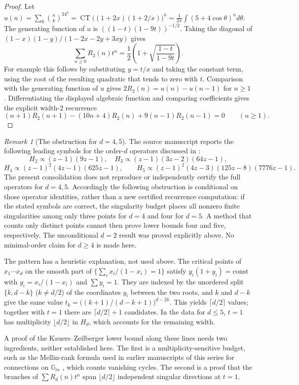 \documentclass[11pt,a4paper]{article}
\theoremstyle{definition}
\theoremstyle{remark}
\newtheorem{remark}[theorem]{Remark}
\numberwithin{equation}{section}
\DeclareMathOperator{\CT}{CT}
\begin{document}
\begin{proof}
Let $u(n)=\sum_k\binom nk^24^k=\CT\bigl((1+2x)(1+2/x)\bigr)^n
=\frac1{2\pi}\int(5+4\cos\theta)^nd\theta$. The generating function of $u$ is $((1-t)(1-9t))^{-1/2}$.
Taking the diagonal of $(1-x)(1-y)/(1-2x-2y+3xy)$ gives
\[
 \sum_{n\ge0}R_2(n)t^n
 =\frac12\left(1+\sqrt{\frac{1-t}{1-9t}}\right).
\]
For example this follows by substituting $y=t/x$ and taking the
constant term, using the root of the resulting quadratic that tends to zero
with $t$. Comparison with the generating function of $u$ gives
$2R_2(n)=u(n)-u(n-1)$ for $n\ge1$. Differentiating the displayed algebraic
function and comparing coefficients gives the explicit width-$2$ recurrence
\[
 (n+1)R_2(n+1)-(10n+4)R_2(n)+9(n-1)R_2(n-1)=0
 \qquad(n\ge1).
\]
\end{proof}

\begin{remark}[The obstruction for $d=4,5$]\label{B:F:rem:rook-obstruction}
The source manuscript reports the following leading symbols for the
order-$d$ operators discussed in \cite[Proposition~2.12]{R022}:
\[
 H_2\propto(z-1)(9z-1),\quad
 H_3\propto(z-1)(3z-2)(64z-1),
\]
\[
 H_4\propto(z-1)^2(4z-1)(625z-1),\qquad
 H_5\propto(z-1)^2(4z-3)(125z-8)(7776z-1).
\]
The present consolidation does not reproduce or independently certify the
full operators for $d=4,5$. Accordingly the following obstruction is
conditional on those operator identities, rather than a new certified
recurrence computation: if the stated symbols are correct, the singularity
budget places all nonzero finite singularities among only three points for
$d=4$ and four for $d=5$. A method that counts only distinct points cannot
then prove lower bounds four and five, respectively. The unconditional
$d=2$ result was proved explicitly above. No minimal-order claim for
$d\ge4$ is made here.

The pattern has a heuristic explanation, not used above. The critical points
of $x_1\cdots x_d$ on the smooth part of $\{\sum_ix_i/(1-x_i)=1\}$ satisfy
$y_i(1+y_i)=\text{const}$ with $y_i=x_i/(1-x_i)$ and $\sum y_i=1$. They are
indexed by the unordered split $\{k,d-k\}$ ($k\ne d/2$) of the coordinates
$y_i$ between the two roots, and $k$ and $d-k$ give the same value
$t_k=\bigl((k+1)/(d-k+1)\bigr)^{d-2k}$. This yields $\lceil d/2\rceil$
values; together with $t=1$ there are $\lceil d/2\rceil+1$ candidates. In the
data for $d\le5$, $t=1$ has multiplicity $\lfloor d/2\rfloor$ in $H_d$, which
accounts for the remaining width.

A proof of the Kauers--Zeilberger lower bound along these lines needs two
ingredients, neither established here. The first is a multiplicity-sensitive
budget, such as the Mellin-rank formula used in earlier manuscripts of this
series for connections on $\mathbb G_m$ \cite{R020}, which counts vanishing cycles. The second is a
proof that the branches of $\sum R_d(n)t^n$ span $\lfloor d/2\rfloor$
independent singular directions at $t=1$.
\end{remark}
\end{document}
